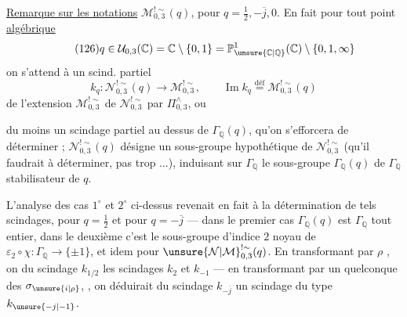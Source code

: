 \uline{Remarque sur les notations} $\mathcal M_{0,3}^{!\sim}(q)$,
pour $q=\frac12,-\overline j,0$.
En fait pour tout point \uline{algébrique}
\[
\tag{126}
q\in\mathcal U_{0,3}(\mathbb C)
=\mathbb C\setminus\{0,1\}
=\mathbb P^1_{\unsure{\mathbb C|\mathbb Q}}(\mathbb C)
\setminus\{0,1,\infty\}
\]
on s'attend à  un scind. partiel
\[
\tag{127}
k_q:\mathcal N_{0,3}^{!\sim}(q)\longrightarrow\mathcal M_{0,3}^{!\sim},
\qquad\operatorname{Im}k_q\overset{\text{déf}}=\mathcal M_{0,3}^{!\sim}(q)
\]
de l'extension $\mathcal M_{0,3}^{!\sim}$ de
$\mathcal N_{0,3}^{!\sim}$ par $\Pi_{0,3}^{\wedge}$, ou



du moins  un scindage partiel au dessus
de $\Gamma_{\mathbb Q}(q)$, qu'on s'efforcera de déterminer ;
$\mathcal N_{0,3}^{!\sim}(q)$ désigne un sous-groupe
 hypothétique de $\mathcal N_{0,3}^{!\sim}$
(qu'il faudrait  à déterminer, 
 pas trop ...), induisant sur $\Gamma_{\mathbb Q}$
le sous-groupe  $\Gamma_{\mathbb Q}(q)$ de
$\Gamma_{\mathbb Q}$ stabilisateur de $q$.


L'analyse des cas $1^\circ$ et $2^\circ$ ci-dessus revenait en fait à
la détermination de tels scindages, pour $q=\frac12$ et pour
$q=-\overline j$ --- dans le premier cas $\Gamma_{\mathbb Q}(q)$ est
$\Gamma_{\mathbb Q}$ tout entier, dans le deuxième c'est le sous-groupe
d'indice $2$ noyau de $\varepsilon_2\circ\chi:\Gamma_{\mathbb Q}
\longrightarrow\{\pm1\}$, et idem pour
$\unsure{\mathcal N|\mathcal M}_{0,3}^{!\sim}(q)$.
En transformant par $\rho$ , on
 du scindage $k_{1/2}$
les scindages $k_2$ et $k_{-1}$ --- en transformant par un quelconque
des $\sigma_{\unsure{i|\rho}}$,
, on déduirait
du scindage $k_{-\overline j}$ un scindage du type $k_{\unsure{-j|-1}}$.

